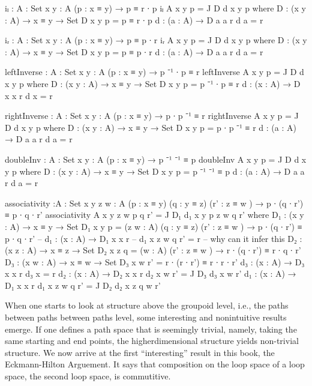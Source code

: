 \documentclass[11pt, a4paper]{article}
\begin{document}
\begin{code}
  iₗ : {A : Set} {x y : A} (p : x ≡ y) → p ≡ r ∙ p
  iₗ {A} {x} {y} p = J D d x y p 
    where
      D : (x y : A) → x ≡ y → Set
      D x y p = p ≡ r ∙ p
      d : (a : A) → D a a r
      d a = r

  iᵣ : {A : Set} {x y : A} (p : x ≡ y) → p ≡ p ∙ r
  iᵣ {A} {x} {y} p = J D d x y p 
    where
      D : (x y : A) → x ≡ y → Set
      D x y p = p ≡ p ∙ r
      d : (a : A) → D a a r
      d a = r

  leftInverse : {A : Set} {x y : A} (p : x ≡ y) → p ⁻¹ ∙ p ≡ r 
  leftInverse {A} {x} {y} p = J D d x y p
    where
      D : (x y : A) → x ≡ y → Set
      D x y p = p ⁻¹ ∙ p ≡ r
      d : (x : A) → D x x r
      d x = r

  rightInverse : {A : Set} {x y : A} (p : x ≡ y) → p ∙ p ⁻¹ ≡ r 
  rightInverse {A} {x} {y} p = J D d x y p
    where
      D : (x y : A) → x ≡ y → Set
      D x y p = p ∙ p ⁻¹ ≡ r
      d : (a : A) → D a a r
      d a = r

  doubleInv : {A : Set} {x y : A} (p : x ≡ y) → p ⁻¹ ⁻¹ ≡ p
  doubleInv {A} {x} {y} p = J D d x y p
    where
      D : (x y : A) → x ≡ y → Set
      D x y p = p ⁻¹ ⁻¹ ≡ p
      d : (a : A) → D a a r
      d a = r

  associativity :{A : Set} {x y z w : A} (p : x ≡ y) (q : y ≡ z) (r' : z ≡ w ) → p ∙ (q ∙ r') ≡ p ∙ q ∙ r'
  associativity {A} {x} {y} {z} {w} p q r' = J D₁ d₁ x y p z w q r'
    where
      D₁ : (x y : A) → x ≡ y → Set
      D₁ x y p = (z w : A) (q : y ≡ z) (r' : z ≡ w ) → p ∙ (q ∙ r') ≡ p ∙ q ∙ r'
      -- d₁ : (x : A) → D₁ x x r 
      -- d₁ x z w q r' = r -- why can it infer this 
      D₂ : (x z : A) → x ≡ z → Set
      D₂ x z q = (w : A) (r' : z ≡ w ) → r ∙ (q ∙ r') ≡ r ∙ q ∙ r'
      D₃ : (x w : A) → x ≡ w → Set
      D₃ x w r' =  r ∙ (r ∙ r') ≡ r ∙ r ∙ r'
      d₃ : (x : A) → D₃ x x r
      d₃ x = r
      d₂ : (x : A) → D₂ x x r
      d₂ x w r' = J D₃ d₃ x w r' 
      d₁ : (x : A) → D₁ x x r
      d₁ x z w q r' = J D₂ d₂ x z q w r'

\end{code}

When one starts to look at structure above the groupoid level, i.e., the paths between paths between paths level, some interesting and nonintuitive results emerge. If one defines a path space that is seemingly trivial, namely, taking the same starting and end points, the higherdimensional structure yields non-trivial structure. 
We now arrive at the first ``interesting'' result in this book, the Eckmann-Hilton Arguement. It says that composition on the loop space of a loop space, the second loop space, is commutitive.
\end{document}

